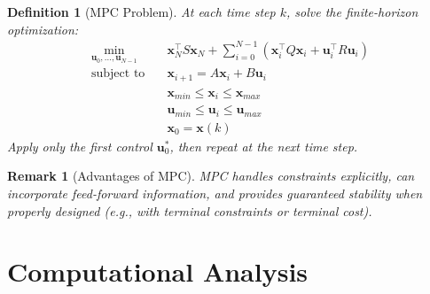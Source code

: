 \documentclass[a4paper, 11pt]{article}
\newtheorem{definition}{Definition}[section]
\newtheorem{remark}{Remark}[section]
\begin{document}
\begin{definition}[MPC Problem]
At each time step $k$, solve the finite-horizon optimization:
\begin{align}
\min_{\mathbf{u}_0, \ldots, \mathbf{u}_{N-1}} \quad & \mathbf{x}_N^\top S \mathbf{x}_N + \sum_{i=0}^{N-1} (\mathbf{x}_i^\top Q \mathbf{x}_i + \mathbf{u}_i^\top R \mathbf{u}_i) \\
\text{subject to} \quad & \mathbf{x}_{i+1} = A\mathbf{x}_i + B\mathbf{u}_i \\
& \mathbf{x}_{min} \leq \mathbf{x}_i \leq \mathbf{x}_{max} \\
& \mathbf{u}_{min} \leq \mathbf{u}_i \leq \mathbf{u}_{max} \\
& \mathbf{x}_0 = \mathbf{x}(k)
\end{align}
Apply only the first control $\mathbf{u}_0^*$, then repeat at the next time step.
\end{definition}

\begin{remark}[Advantages of MPC]
MPC handles constraints explicitly, can incorporate feed-forward information, and
provides guaranteed stability when properly designed (e.g., with terminal constraints
or terminal cost).
\end{remark}

\section{Computational Analysis}
\end{document}
